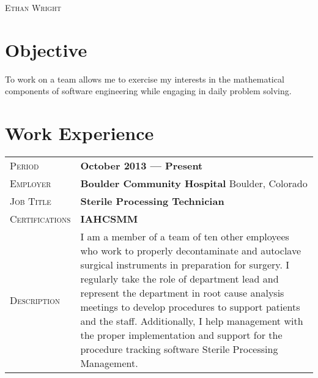 \documentclass[a4paper, oneside, final]{scrartcl} %
\newcommand{\gray}{\rowcolor[gray]{.90}} %
\begin{document}
\begin{center} %


{\fontsize{36}{36}\selectfont\scshape Ethan Wright} %

\vspace{0.5cm} %


  \section{Objective}
\begin{flushleft}
  To work on a team allows me to exercise my interests in the mathematical components of software engineering
      while engaging in daily problem solving.
\end{flushleft}

    \section{Work Experience}

    \begin{tabularx}{0.97\linewidth}{>{\raggedleft\scshape}p{3cm}X}
    \gray Period & \textbf{October 2013 --- Present}\\
    \gray Employer & \textbf{Boulder Community Hospital} \hfill Boulder, Colorado\\
    \gray Job Title & \textbf{Sterile Processing Technician}\\
    \gray Certifications & \textbf{IAHCSMM}\\
    Description & I am a member of a team of ten other employees who work to properly decontaminate and autoclave surgical instruments in preparation for surgery. I regularly take the role of department lead and represent the department in root cause analysis meetings to develop procedures to support patients and the staff. Additionally, I help management with the proper implementation and support for the procedure tracking software Sterile Processing Management.     \end{tabularx}


\end{center}
\end{document}
